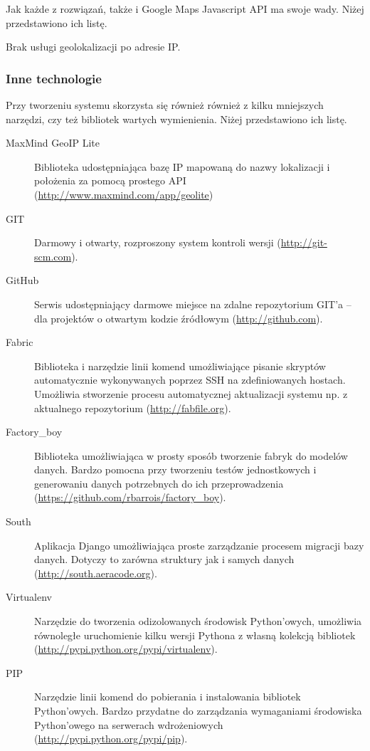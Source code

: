 Jak każde z rozwiązań, także i Google Maps Javascript API ma swoje wady. Niżej przedstawiono ich listę.
\begin{packed_item}
    \item{Brak usługi geolokalizacji po adresie IP.}
\end{packed_item}


\newpage
\subsubsection{Inne technologie}
Przy tworzeniu systemu skorzysta się również również z kilku mniejszych narzędzi, czy też bibliotek wartych wymienienia. Niżej przedstawiono ich listę.

\begin{description}
    \item[MaxMind GeoIP Lite] Biblioteka udostępniająca bazę IP mapowaną do nazwy lokalizacji i położenia za pomocą prostego API  (\url{http://www.maxmind.com/app/geolite})
    \item[GIT] Darmowy i otwarty, rozproszony system kontroli wersji (\url{http://git-scm.com}).
    \item[GitHub] Serwis udostępniający darmowe miejsce na zdalne repozytorium GIT'a -- dla projektów o otwartym kodzie źródłowym (\url{http://github.com}).
    \item[Fabric] Biblioteka i narzędzie linii komend umożliwiające pisanie skryptów automatycznie wykonywanych poprzez SSH na zdefiniowanych hostach. Umożliwia stworzenie procesu automatycznej aktualizacji systemu np. z aktualnego repozytorium (\url{http://fabfile.org}).
    \item[Factory\_boy] Biblioteka umożliwiająca w prosty sposób tworzenie fabryk do modelów danych. Bardzo pomocna przy tworzeniu testów jednostkowych i generowaniu danych potrzebnych do ich przeprowadzenia (\url{https://github.com/rbarrois/factory\_boy}).
    \item[South] Aplikacja Django umożliwiająca proste zarządzanie procesem migracji bazy danych. Dotyczy to zarówna struktury jak i samych danych (\url{http://south.aeracode.org}).
    \item[Virtualenv] Narzędzie do tworzenia odizolowanych środowisk Python'owych, umożliwia równoległe uruchomienie kilku wersji Pythona z własną kolekcją bibliotek (\url{http://pypi.python.org/pypi/virtualenv}).
    \item[PIP] Narzędzie linii komend do pobierania i instalowania bibliotek Python'owych. Bardzo przydatne do zarządzania wymaganiami środowiska Python'owego na serwerach wdrożeniowych (\url{http://pypi.python.org/pypi/pip}).

\end{description}
